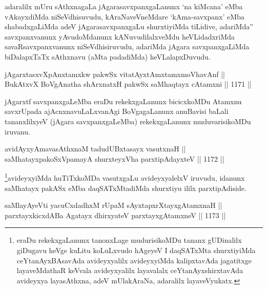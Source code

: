 \begin{artha}
adaralilx mUru sAthxnagaLa jAgarasavxpanxgaLanunx `na kiMcana' eMba vAkayxdiMda niSeVdhisuvudu, kAraNaveVneMdare `kAma-savxpanx' eMba shabadxgaLiMda adeV jAgarasavxpanxgaLu shurxtiyiMda tiLidive, adariMda'' savxpanxvanunx yAvudoMdanunx kANuvudilalxveMdu heVLidadxriMda savaRsavxpanxvanunx niSeVdhisiruvudu, adariMda jAgara savxpanxgaLiMda biDalapxTaTx sAthxnavu (aMta padadiMda) heVLalapxDuvudu.
\end{artha}


\begin{shl}
jAgarxtasxvXpAnxtamxkw pakwSx vitatAyx\s \s tAmx\s \s tamxmoVhavAnf || \\
BukAtxvX BoVgAnatha shArxnatxH pakwSx saMhaqtayx cA\s \s tamxni ||  1171 ||  
\end{shl}

\begin{artha}
jAgarxtf savxpanxgaLeMba eraDu rekekxgaLanunx bicicxkoMDu Atamxnu savxrUpada ajAcnxnavuLaLxvanAgi BoVgagaLanunx anuBavisi baLali tananxlilxyeV (jAgara savxpanxgaLeMba) rekekxgaLanunx muduvarisikoMDu iruvanu.
\end{artha}


\begin{shl}
avidAyxyAmavasAthxnaM tadudUBxtasayx vasutxnaH || \\
saMhatayxpakoSxVpamayA shurxteyxVha parxtipAdayxteV ||  1172 ||  
\end{shl}

\begin{artha}
\footnote{eraDu rekekxgaLanunx tanonxLage mudurisikoMDu tananx gUDinalilx giDugavu heVge kuLitu koLuLxvudo hAgeyeV I daqSATxMta shurxtiyiMda ceYtanAyxBAsavAda avideyxyalilx avideyxyiMda kalipxtavAda jagatitxge layaveMdathaR keVvala avideyxyalilx layavalalx ceYtanAyxshirxtavAda avideyxya layasAthxna, adeV mUlakAraNa, adaralilx layaveVyukatx.}avideyxyiMda huTiTxkoMDa vasutxgaLu avideyxyalelxV iruvudu, idanunx saMhatayx pakASx eMba daqSATxMtadiMda shurxtiyu ililx parxtipAdiside.
\end{artha}


\begin{shl}
saMlayAyeVti yacuCxdadhxM rUpaM sAyxtapxrXtayxgAtamxnaH || \\
parxtayxkicxdABa Agatayx dhirxyateV parxtayxgAtamxneV ||  1173 ||  
\end{shl}

